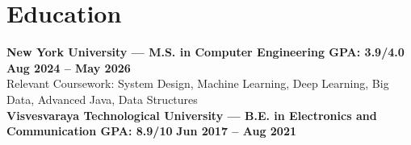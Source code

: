 \documentclass[letterpaper,10pt]{article}
\begin{document}
\section{Education}
\footnotesize{
\textbf{New York University --- M.S. in Computer Engineering \textbar{} GPA: 3.9/4.0} \hfill \textbf{Aug 2024 -- May 2026} \\
Relevant Coursework: System Design, Machine Learning, Deep Learning, Big Data, Advanced Java, Data Structures \\
\vspace{1pt}
\textbf{Visvesvaraya Technological University --- B.E. in Electronics and Communication \textbar{} GPA: 8.9/10} \hfill \textbf{Jun 2017 -- Aug 2021}
}
\end{document}
